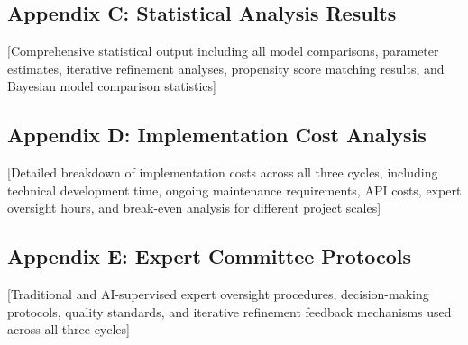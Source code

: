 \documentclass[12pt,a4paper]{article}
\begin{document}
\subsection{Appendix C: Statistical Analysis Results}

[Comprehensive statistical output including all model comparisons, parameter estimates, iterative refinement analyses, propensity score matching results, and Bayesian model comparison statistics]

\subsection{Appendix D: Implementation Cost Analysis}

[Detailed breakdown of implementation costs across all three cycles, including technical development time, ongoing maintenance requirements, API costs, expert oversight hours, and break-even analysis for different project scales]

\subsection{Appendix E: Expert Committee Protocols}

[Traditional and AI-supervised expert oversight procedures, decision-making protocols, quality standards, and iterative refinement feedback mechanisms used across all three cycles]
\end{document}
